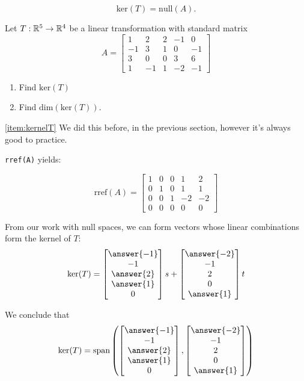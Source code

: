 \documentclass{ximera}
\begin{document}
$$\mbox{ker}(T)=\mbox{null}(A).$$
 
\begin{example}\label{ex:kernel} Let $T:\mathbb{R}^5\rightarrow \mathbb{R}^4$ be a linear transformation with standard matrix $$A=\begin{bmatrix}1 & 2 & 2 &-1 & 0\\-1 & 3 & 1 & 0 & -1\\3 & 0 & 0 & 3 & 6\\ 1 & -1 & 1 & -2 & -1\end{bmatrix}$$
\begin{enumerate}
\item \label{item:kernelT}
Find $\mbox{ker}(T)$
\item \label{item:dimkernelT}
Find $\mbox{dim}(\mbox{ker}(T))$.
\end{enumerate}
\begin{explanation}

\ref{item:kernelT} We did this before, in the previous section, however it's always good to practice.
 
\texttt{rref(A)} yields:
 
$$\mbox{rref}(A)= \begin{bmatrix} 1 & 0 & 0 & 1 & 2\\0 & 1 & 0 & 1 & 1\\0 & 0 & 1 & -2 & -2\\ 0 & 0 & 0 & 0 & 0 \end{bmatrix}$$
 
From our work with null spaces, we can form vectors whose linear combinations form the kernel of $T$:
$$\mbox{ker}(T)=\begin{bmatrix}\answer{-1}\\-1\\\answer{2}\\\answer{1}\\0\end{bmatrix}s+\begin{bmatrix}\answer{-2}\\-1\\2\\0\\\answer{1}\end{bmatrix}t$$
 
We conclude that
$$\mbox{ker}(T)=\mbox{span}\left(\begin{bmatrix}\answer{-1}\\-1\\\answer{2}\\\answer{1}\\0\end{bmatrix},\begin{bmatrix}\answer{-2}\\-1\\2\\0\\\answer{1}\end{bmatrix}\right)$$
 

\end{explanation}
\end{example}
\end{document}
